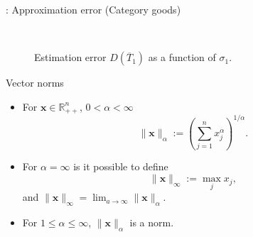 \documentclass[10pt, handout]{beamer}
\begin{document}
\begin{frame}[label=Category-Dt,plain,noframenumbering]{\secname: Approximation error (Category goods)\,\hyperlink{Category-Example}{\beamerreturnbutton} }
	\begin{figure}[H] 
		\caption{Estimation error $D(\overline{T}_{1})$ as a function of $\sigma_{1}$.}
		\label{fig:CategoryDiff1Plot}
		\,
	\end{figure}
\end{frame}


\begin{frame}[label=Vector-Norms,plain,noframenumbering]{Vector norms\,\hyperlink{Category-Model}{\beamerreturnbutton}}
	\vfill
	\begin{itemize}
		\item For $\mathbf{x} \in \mathbb{R}^{n}_{++}$, $0 < \alpha < \infty$
				$$\|\mathbf{x}\|_{\alpha} := \left(\sum_{j=1}^{n} x_{j}^{\alpha} \right)^{1/\alpha}.$$
				\vfill
			
		\item For $\alpha = \infty$ is it possible to define
				$$\|\mathbf{x}\|_{\infty} := \max_{j} x_{j},$$
			and $\|\mathbf{x}\|_{\infty} = \lim_{a \to \infty} \|\mathbf{x}\|_{\alpha}$.
				\vfill
		
		\item For $1\leq \alpha \leq \infty$, $\|\mathbf{x}\|_{\alpha}$ is a norm.
	\end{itemize}
	\vfill

\end{frame}
\end{document}

